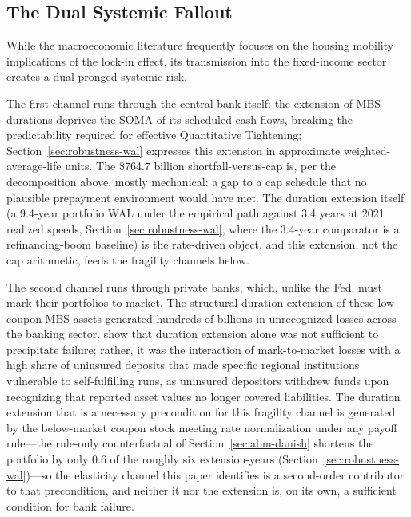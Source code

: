 \documentclass[12pt]{article}
\begin{document}
\subsection{The Dual Systemic Fallout}\label{sec:discussion-fallout}

While the macroeconomic literature frequently focuses on the housing mobility implications of the lock-in effect, its transmission into the fixed-income sector creates a dual-pronged systemic risk.

The first channel runs through the central bank itself: the extension of MBS durations deprives the SOMA of its scheduled cash flows, breaking the predictability required for effective Quantitative Tightening; Section~\ref{sec:robustness-wal} expresses this extension in approximate weighted-average-life units. The \$764.7 billion shortfall-versus-cap is, per the decomposition above, mostly mechanical: a gap to a cap schedule that no plausible prepayment environment would have met. The duration extension itself (a 9.4-year portfolio WAL under the empirical path against 3.4 years at 2021 realized speeds, Section~\ref{sec:robustness-wal}, where the 3.4-year comparator is a refinancing-boom baseline) is the rate-driven object, and this extension, not the cap arithmetic, feeds the fragility channels below.

The second channel runs through private banks, which, unlike the Fed, must mark their portfolios to market. The structural duration extension of these low-coupon MBS assets generated hundreds of billions in unrecognized losses across the banking sector. \citet{jiang2023} show that duration extension alone was not sufficient to precipitate failure; rather, it was the interaction of mark-to-market losses with a high share of uninsured deposits that made specific regional institutions vulnerable to self-fulfilling runs, as uninsured depositors withdrew funds upon recognizing that reported asset values no longer covered liabilities. The duration extension that is a necessary precondition for this fragility channel is generated by the below-market coupon stock meeting rate normalization under any payoff rule---the rule-only counterfactual of Section~\ref{sec:abm-danish} shortens the portfolio by only 0.6 of the roughly six extension-years (Section~\ref{sec:robustness-wal})---so the elasticity channel this paper identifies is a second-order contributor to that precondition, and neither it nor the extension is, on its own, a sufficient condition for bank failure.
\end{document}
